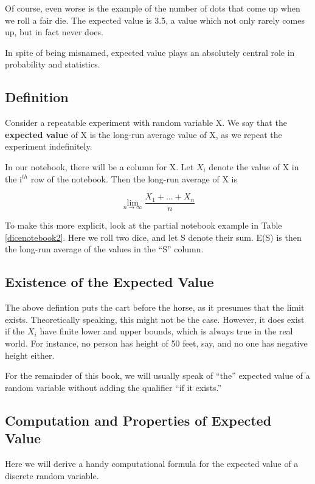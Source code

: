 Of course, even worse is the example of the number of dots that come up
when we roll a fair die.  The expected value is 3.5, a value which not
only rarely comes up, but in fact never does.

In spite of being misnamed, expected value plays an absolutely central
role in probability and statistics.

\subsection{Definition}

Consider a repeatable experiment with random variable X.  We say that
the {\bf expected value} of X is the long-run average value of X, as we
repeat the experiment indefinitely.

In our notebook, there will be a column for X.  Let $X_i$ denote the
value of X in the i$^{th}$ row of the notebook.  Then the long-run
average of X is 

\begin{equation}
\label{longrunavg}
\lim_{n \rightarrow \infty} \frac{X_1+...+X_n}{n}
\end{equation}

To make this more explicit, look at the partial notebook example in
Table \ref{dicenotebook2}.  Here we roll two dice, and let S denote
their sum.  E(S) is then the long-run average of the values in the ``S''
column.

\subsection{Existence of the Expected Value}

The above defintion puts the cart before the horse, as it presumes that
the limit exists.  Theoretically speaking, this might not be the case.
However, it does exist if the $X_i$ have finite lower and upper bounds,
which is always true in the real world.  For instance, no person has
height of 50 feet, say, and no one has negative height either.

For the remainder of this book, we will usually speak of ``the''
expected value of a random variable without adding the qualifier ``if it
exists.''

\subsection{Computation and Properties of Expected Value}

Here we will derive a handy computational formula for the expected value
of a discrete random variable.

